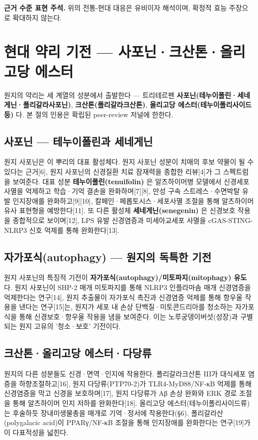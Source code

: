 \documentclass[11pt,oneside]{book}
\newenvironment{authnote}
  {\par\smallskip\begingroup\leftskip=7mm\rightskip=5mm\small\color{muted}\noindent\ignorespaces}
  {\par\endgroup\smallskip}
\begin{document}
\begin{authnote}\textbf{근거 수준 표현 주석.} 위의 전통-현대 대응은 유비이자 해석이며, 확정적 효능 주장으로 확대하지 않는다.\end{authnote}
\section{현대 약리 기전 — 사포닌·크산톤·올리고당 에스터}
원지의 약리는 세 계열의 성분에서 출발한다 — 트리테르펜 \textbf{사포닌(테누이폴린·세네게닌·폴리갈라사포닌)}, \textbf{크산톤(폴리갈라크산톤)}, \textbf{올리고당 에스터(테누이폴리사이드 등)} 다. 본 절의 인용은 확립된 peer-review 저널에 한한다.

\subsection{사포닌 — 테누이폴린과 세네게닌}
원지 사포닌은 이 뿌리의 대표 활성체다. 원지 사포닌 성분이 치매의 후보 약물이 될 수 있다는 근거[6], 원지 사포닌의 신경질환 치료 잠재력을 종합한 리뷰[4]가 그 스펙트럼을 보여준다. 대표 성분 \textbf{테누이폴린(tenuifolin)} 은 알츠하이머병 모델에서 신경세포 사멸을 억제하고 학습·기억 결손을 완화하며[7][8], 만성 구속 스트레스·수면박탈 유발 인지장애를 완화하고[9][10], 칼페인·페롭토시스·세포사멸 조절을 통해 알츠하이머 유사 표현형을 예방한다[11]. 또 다른 활성체 \textbf{세네게닌(senegenin)} 은 신경보호 작용을 종합적으로 보이며[12], LPS 유발 신경염증과 미세아교세포 사멸을 cGAS-STING-NLRP3 신호 억제를 통해 완화한다[13].

\subsection{자가포식(autophagy) — 원지의 독특한 기전}
원지 사포닌의 특징적 기전이 \textbf{자가포식(autophagy)/미토파지(mitophagy) 유도} 다. 원지 사포닌이 SHP-2 매개 미토파지를 통해 NLRP3 인플라마솜 매개 신경염증을 억제한다는 연구[14], 원지 추출물이 자가포식 촉진과 신경염증 억제를 통해 항우울 작용을 낸다는 연구[15]는, 원지가 세포 내 손상 단백질·미토콘드리아를 청소하는 자가포식을 통해 신경보호·항우울 작용을 냄을 보여준다. 이는 노루궁뎅이버섯(성장)과 구별되는 원지 고유의 '청소·보호' 기전이다.

\subsection{크산톤·올리고당 에스터·다당류}
원지의 다른 성분들도 신경·면역·인지에 작용한다. 폴리갈라크산톤 III가 대식세포 염증을 하향조절하고[16], 원지 다당류(PTP70-2)가 TLR4-MyD88/NF-κB 억제를 통해 신경염증을 막고 신경을 보호하며[17], 원지 다당류가 Aβ 손상 완화와 ERK 경로 조절을 통해 알츠하이머 인지 저하를 완화한다[18]. 올리고당 에스터(테누이폴리사이드류)는 후술하듯 장내미생물총을 매개로 기억·정서에 작용한다(§6). 폴리갈라산(polygalacic acid)이 PPARγ/NF-κB 조절을 통해 인지장애를 완화한다는 연구[19]가 이 다표적성을 넓힌다.
\end{document}
